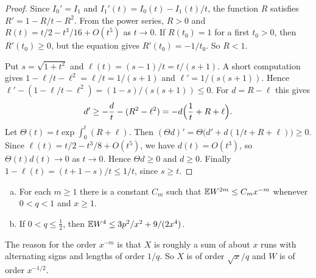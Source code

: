 \begin{proof}
Since $I_0'=I_1$ and $I_1'(t)=I_0(t)-I_1(t)/t$, the function $R$ satisfies
$R'=1-R/t-R^2$. From the power series, $R>0$ and
$R(t)=t/2-t^3/16+O(t^5)$ as $t\to0$. If $R(t_0)=1$ for a first $t_0>0$, then
$R'(t_0)\ge0$, but the equation gives $R'(t_0)=-1/t_0$. So $R<1$.

Put $s=\sqrt{1+t^2}$ and $\ell(t)=(s-1)/t=t/(s+1)$. A short computation
gives $1-\ell/t-\ell^2=\ell/t=1/(s+1)$ and $\ell'=1/(s(s+1))$. Hence
$\ell'-(1-\ell/t-\ell^2)=(1-s)/(s(s+1))\le0$. For $d=R-\ell$ this gives
\[
 d'\ge-\frac dt-(R^2-\ell^2)=-d\Bigl(\frac1t+R+\ell\Bigr).
\]
Let $\Theta(t)=t\exp\int_0^t(R+\ell)$. Then
$(\Theta d)'=\Theta\bigl(d'+d(1/t+R+\ell)\bigr)\ge0$. Since
$\ell(t)=t/2-t^3/8+O(t^5)$, we have $d(t)=O(t^3)$, so $\Theta(t)d(t)\to0$ as
$t\to0$. Hence $\Theta d\ge0$ and $d\ge0$. Finally
$1-\ell(t)=(t+1-s)/t\le1/t$, since $s\ge t$.
\end{proof}

\begin{lemma}\label{lem:fisher-W}
\begin{enumerate}[(a)]
\item For each $m\ge1$ there is a constant $C_m$ such that
$\mathbb{E} W^{2m}\le C_mx^{-m}$ whenever $0<q<1$ and $x\ge1$.
\item If $0<q\le\frac12$, then $\mathbb{E} W^4\le3p^2/x^2+9/(2x^4)$.
\end{enumerate}
\end{lemma}

The reason for the order $x^{-m}$ is that $X$ is roughly a sum of about $x$
runs with alternating signs and lengths of order $1/q$. So $X$ is of order
$\sqrt x/q$ and $W$ is of order $x^{-1/2}$.

